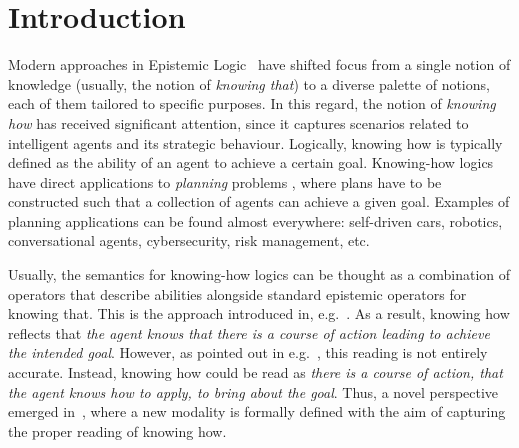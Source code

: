 \section{Introduction}
\label{sec:intro}

Modern approaches in Epistemic Logic~\cite{vonWright:1951,Hintikka:1962} have shifted focus from a single notion of knowledge (usually, the notion of \emph{knowing that}) to a diverse palette of notions, each of them tailored to specific purposes. In this regard, the notion of \emph{knowing how} has received significant attention, since it captures scenarios related to intelligent agents and its strategic behaviour. Logically, knowing how is typically defined as the ability of an agent to achieve a certain goal.  Knowing-how logics have direct applications to \emph{planning} problems \cite{Stuart21},  where  plans have to be constructed such that a collection of agents can achieve a given goal.  Examples of planning applications can be found almost everywhere: self-driven cars,  robotics,  conversational agents,  cybersecurity,  risk management,  etc.

Usually,  the semantics for knowing-how logics can be thought as a combination of operators that describe abilities alongside standard epistemic operators for knowing that.  This is the approach introduced in, e.g.~\cite{Mccarthy69,Moore85,Les00,Hoek00,HerzigT06}. As a result,  knowing how reflects that \emph{the agent knows that there is a course of action leading to achieve the intended goal}. However,  as pointed out in e.g.~\cite{JamrogaA07,Herzig15}, this reading is not entirely accurate.  Instead, knowing how could be read as \emph{there is a course of action, that the agent knows how to apply, to bring about the goal}. Thus, a novel perspective emerged in~\cite{Wang15lori,Wang16,Wang2016}, where a new modality is formally defined with the aim of capturing the proper reading of knowing how. 

